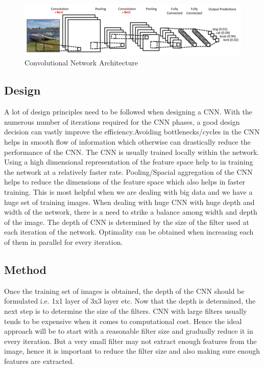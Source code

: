 \documentclass[sigconf]{acmart}
\begin{document}
\begin{figure}[htp]
    \includegraphics[width=1\textwidth]{images/image1.png}
    \caption{Convolutional Network Architecture \cite{google}}
    \label{fig:figure1}
\end{figure}

\subsection{Design}
A lot of design principles need to be followed when designing a CNN. With the numerous number of iterations required for the CNN phases, a good design decision can vastly improve the efficiency.Avoiding bottlenecks/cycles in the CNN helps in smooth flow of information which otherwise can drastically reduce the performance of the CNN. The CNN is usually trained locally within the network. Using a high dimensional representation of the feature space help to in training the network at a relatively faster rate. Pooling/Spacial aggregation of the CNN helps to reduce the dimensions of the feature space which also helps in faster training. This is most helpful when we are dealing with big data and we have a huge set of training images. When dealing with huge CNN with huge depth and width of the network, there is a need to strike a balance among width and depth of the image. The depth of CNN is determined by the size of the filter used at each iteration of the network. Optimality can be obtained when increasing each of them in parallel for every iteration.\cite{Christian}

\subsection{Method}
Once the training set of images is obtained, the depth of the CNN should be formulated i.e. 1x1 layer of 3x3 layer etc. Now that the depth is determined, the next step is to determine the size of the filters. CNN with large filters usually tends to be expensive when it comes to computational cost. Hence the ideal approach will be to start with a reasonable filter size and gradually reduce it in every iteration. But a very small filter may not extract enough features from the image, hence it is important to reduce the filter size and also making sure enough features are extracted.\cite{Christian}
\end{document}
